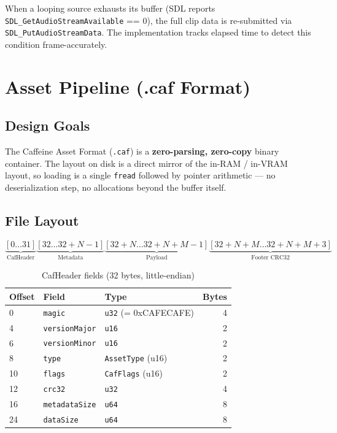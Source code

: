\documentclass[12pt, a4paper]{report}
\theoremstyle{definition}
\theoremstyle{remark}
\begin{document}
When a looping source exhausts its buffer (SDL reports
\texttt{SDL\_GetAudioStreamAvailable} == 0), the full clip data is
re-submitted via \texttt{SDL\_PutAudioStreamData}. The implementation
tracks elapsed time to detect this condition frame-accurately.

\chapter{Asset Pipeline (.caf Format)}

\section{Design Goals}

The Caffeine Asset Format (\texttt{.caf}) is a \textbf{zero-parsing,
zero-copy} binary container. The layout on disk is a direct mirror of
the in-RAM / in-VRAM layout, so loading is a single \texttt{fread} followed
by pointer arithmetic — no deserialization step, no allocations beyond
the buffer itself.

\section{File Layout}

\begin{equation*}
\underbrace{[0\ldots 31]}_{\text{CafHeader}}
\underbrace{[32\ldots 32+N-1]}_{\text{Metadata}}
\underbrace{[32+N\ldots 32+N+M-1]}_{\text{Payload}}
\underbrace{[32+N+M\ldots 32+N+M+3]}_{\text{Footer CRC32}}
\end{equation*}

\begin{table}[H]
\centering
\caption{CafHeader fields (32 bytes, little-endian)}
\begin{tabular}{lllr}
\toprule
\textbf{Offset} & \textbf{Field} & \textbf{Type} & \textbf{Bytes} \\
\midrule
0  & \texttt{magic}        & \texttt{u32} (= 0xCAFECAFE) & 4 \\
4  & \texttt{versionMajor} & \texttt{u16}                & 2 \\
6  & \texttt{versionMinor} & \texttt{u16}                & 2 \\
8  & \texttt{type}         & \texttt{AssetType} (u16)    & 2 \\
10 & \texttt{flags}        & \texttt{CafFlags} (u16)     & 2 \\
12 & \texttt{crc32}        & \texttt{u32}                & 4 \\
16 & \texttt{metadataSize} & \texttt{u64}                & 8 \\
24 & \texttt{dataSize}     & \texttt{u64}                & 8 \\
\bottomrule
\end{tabular}
\end{table}
\end{document}

